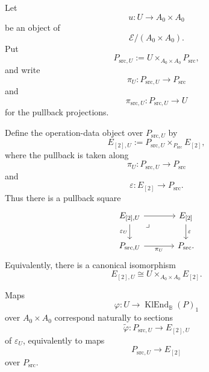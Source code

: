 \begin{proposition}
\label{prop:to-klend-representation-property}
    Let
    \[
        u:U\to A_0\times A_0
    \]
    be an object of
    \[
        \mathcal E/(A_0\times A_0).
    \]
    Put
    \[
        P_{\mathrm{src},U}
        :=
        U
        \times_{A_0\times A_0}
        P_{\mathrm{src}},
    \]
    and write
    \[
        \pi_U:
        P_{\mathrm{src},U}
        \to
        P_{\mathrm{src}}
    \]
    and
    \[
        \pi_{\mathrm{src},U}:
        P_{\mathrm{src},U}
        \to
        U
    \]
    for the pullback projections.

    Define the operation-data object over \(P_{\mathrm{src},U}\) by
    \[
        E_{[2],U}
        :=
        P_{\mathrm{src},U}
        \times_{P_{\mathrm{src}}}
        E_{[2]},
    \]
    where the pullback is taken along
    \[
        \pi_U:
        P_{\mathrm{src},U}\to P_{\mathrm{src}}
    \]
    and
    \[
        \varepsilon:
        E_{[2]}\to P_{\mathrm{src}}.
    \]
    Thus there is a pullback square
    \[
    \begin{tikzcd}[column sep=large]
        E_{[2],U}
            \arrow[r]
            \arrow[d, "\varepsilon_U"']
            \arrow[dr, phantom, "\lrcorner", very near start]
        &
        E_{[2]}
            \arrow[d, "\varepsilon"]
        \\
        P_{\mathrm{src},U}
            \arrow[r, "\pi_U"']
        &
        P_{\mathrm{src}}.
    \end{tikzcd}
    \]
    Equivalently, there is a canonical isomorphism
    \[
        E_{[2],U}
        \cong
        U\times_{A_0\times A_0}E_{[2]}.
    \]

    Maps
    \[
        \varphi:
        U\to
        \operatorname{KlEnd}_{\mathbb B}(P)_1
    \]
    over \(A_0\times A_0\) correspond naturally to sections
    \[
        \widetilde\varphi:
        P_{\mathrm{src},U}
        \to
        E_{[2],U}
    \]
    of \(\varepsilon_U\), equivalently to maps
    \[
        P_{\mathrm{src},U}
        \to
        E_{[2]}
    \]
    over \(P_{\mathrm{src}}\).
\end{proposition}

